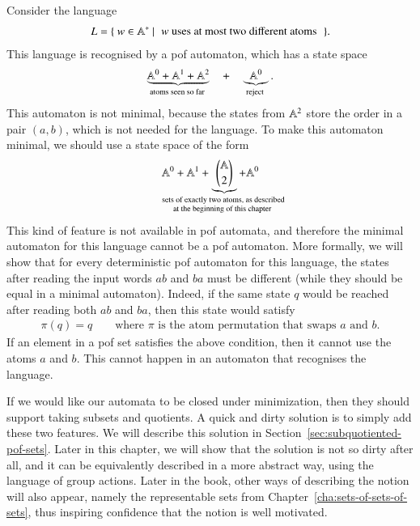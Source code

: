 \begin{myexample}\label{ex:pof-dont-minimize}
    Consider the language
    \begin{align*}
    L = \setbuild{w \in \atoms^*}{\text{$w$ uses at most two different atoms}}.
    \end{align*}
    This language is recognised by a pof automaton, which has a state space 
    \begin{align*}
        \myunderbrace{\atoms^0+\atoms^1 + \atoms^2}{atoms seen so far}
        \quad + \quad 
        \myunderbrace{\atoms^0}{reject}.
    \end{align*}
    This automaton is not minimal, because the states from $\mathbb A^2$ store the order in a pair $(a,b)$, which is not needed for the language.
     To make this automaton minimal, we should use a state space of the form
    \begin{align*}
    \atoms^0 + \atoms^1 + 
    \myunderbrace{\atoms \choose 2}{sets of exactly two atoms, as described \\ at the beginning of this chapter } + \atoms^0
    \end{align*}
    This kind of feature is not available in pof automata, and therefore the minimal automaton for this language cannot be a pof automaton. More formally, we will show that for every deterministic pof automaton for this language, the states after reading the input words $ab$ and $ba$ must be different (while they should be equal in a minimal automaton). Indeed, if the same state $q$ would be reached after reading both $ab$ and $ba$,  then this state would satisfy 
    \begin{align*}
    \pi(q) = q \qquad \text{where $\pi$ is the atom permutation that swaps $a$ and $b$}.
    \end{align*}
    If an element in a pof set satisfies the above condition, then it cannot use the atoms $a$ and $b$. This cannot happen in an automaton that recognises the language.
\end{myexample}

If we would like our automata to be closed under minimization, then they should support taking subsets and quotients. A quick and dirty solution is to simply add these two features. We will describe this solution in Section~\ref{sec:subquotiented-pof-sets}. Later in this chapter, we will show that the solution is not so dirty after all, and it can be equivalently described in a more abstract way, using the language of group actions. Later in the book, other ways of describing the notion will also appear, namely the representable sets from Chapter~\ref{cha:sets-of-sets-of-sets}, thus inspiring confidence that the notion is well motivated.


